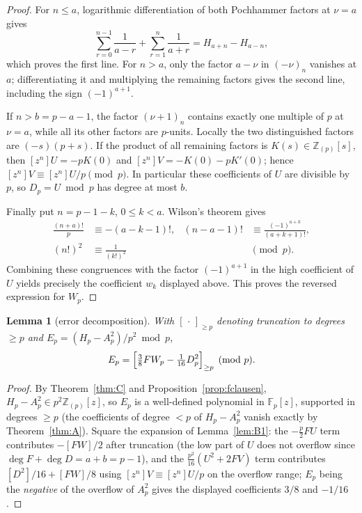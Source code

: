 \documentclass[11pt]{amsart}
\newtheorem{lemma}[theorem]{Lemma}
\theoremstyle{definition}
\theoremstyle{remark}
\newcommand{\Fp}{\mathbb{F}_p}
\newcommand{\Zp}{\mathbb{Z}_{(p)}}
\begin{document}
\begin{proof}
For $n\le a$, logarithmic differentiation of both Pochhammer factors
at $\nu=a$ gives
\[
 \sum_{r=0}^{n-1}\frac1{a-r}
 +\sum_{r=1}^{n}\frac1{a+r}=H_{a+n}-H_{a-n},
\]
which proves the first line.  For $n>a$, only the factor
$a-\nu$ in $(-\nu)_n$ vanishes at $a$; differentiating it and
multiplying the remaining factors gives the second line, including the
sign $(-1)^{a+1}$.

If $n>b=p-a-1$, the factor $(\nu+1)_n$ contains exactly one multiple of
$p$ at $\nu=a$, while all its other factors are $p$-units.  Locally the
two distinguished factors are $(-s)(p+s)$.  If the product of all
remaining factors is $K(s)\in\Zp[s]$, then
$[z^n]U=-pK(0)$ and $[z^n]V=-K(0)-pK'(0)$; hence
$[z^n]V\equiv[z^n]U/p\pmod p$.  In particular these coefficients of
$U$ are divisible by $p$, so $D_p=U\bmod p$ has degree at most $b$.

Finally put $n=p-1-k$, $0\le k<a$.  Wilson's theorem gives
\[
 \begin{aligned}
 \frac{(n+a)!}{p}&\equiv-(a-k-1)!,&
 (n-a-1)!&\equiv\frac{(-1)^{a+k}}{(a+k+1)!},\\
 (n!)^2&\equiv\frac1{(k!)^2}&&\pmod p.
 \end{aligned}
\]
Combining these congruences with the factor $(-1)^{a+1}$ in the high
coefficient of $U$ yields precisely the coefficient $w_k$ displayed
above.  This proves the reversed expression for $W_p$.
\end{proof}

\begin{lemma}[error decomposition]\label{lem:B3}
With $[\,\cdot\,]_{\ge p}$ denoting truncation to degrees $\ge p$ and
$E_p=(H_p-A_p^2)/p^2\bmod p$,
\[
E_p=\Bigl[\tfrac38FW_p-\tfrac1{16}D_p^2\Bigr]_{\ge p}\pmod p .
\]
\end{lemma}

\begin{proof}
By Theorem~\ref{thm:C} and Proposition~\ref{prop:fclausen},
$H_p-A_p^2\in p^2\Zp[z]$, so $E_p$ is a well-defined polynomial in
$\Fp[z]$, supported in degrees $\ge p$ (the coefficients of degree $<p$
of $H_p-A_p^2$ vanish exactly by Theorem~\ref{thm:A}). Square the
expansion of Lemma~\ref{lem:B1}: the $-\frac p2FU$ term contributes
$-[FW]/2$ after truncation (the low part of $U$ does not overflow since
$\deg F+\deg D=a+b=p-1$), and the $\frac{p^2}{16}(U^2+2FV)$ term
contributes $[D^2]/16+[FW]/8$ using $[z^n]V\equiv[z^n]U/p$ on the
overflow range; $E_p$ being the \emph{negative} of the overflow of
$A_p^2$ gives the displayed coefficients $3/8$ and $-1/16$.
\end{proof}
\end{document}
